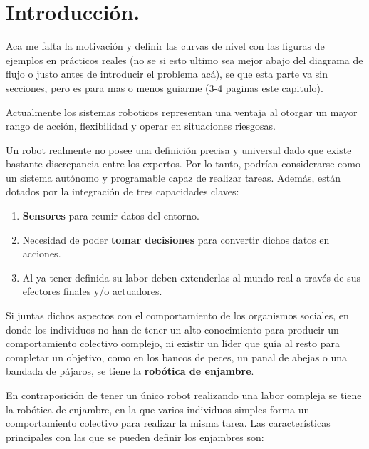 

\chapter{Introducción.} 
\label{ch:chapter1}
\setlength{\parindent}{0cm}
\setlength{\parskip}{4mm}

Aca me falta la motivación y definir las curvas de nivel con las figuras de ejemplos en prácticos reales (no se si esto ultimo sea mejor abajo del diagrama de flujo o justo antes de introducir el problema acá), se que esta parte va sin secciones, pero es para mas o menos guiarme (3-4 paginas este capitulo).

Actualmente los sistemas roboticos representan una ventaja al otorgar un mayor rango de acción, flexibilidad y operar en situaciones riesgosas.

Un robot realmente no posee una definición precisa y universal dado que existe bastante discrepancia entre los expertos. Por lo tanto, podrían considerarse como un sistema autónomo y programable capaz de realizar tareas. Además, están dotados por la integración de tres capacidades claves:

\begin{enumerate}
	\item \textbf{Sensores} para reunir datos del entorno.
	\item Necesidad de poder \textbf{tomar decisiones} para convertir dichos datos en acciones.
	\item Al ya tener definida su labor deben extenderlas al mundo real a través de sus efectores finales y/o actuadores.
\end{enumerate}

Si juntas dichos aspectos con el comportamiento de los organismos sociales, en donde los individuos no han de tener un alto conocimiento para producir un comportamiento colectivo complejo, ni existir un líder que guía al resto para completar un objetivo, como en los bancos de peces, un panal de abejas o una bandada de pájaros, se tiene la \textbf{robótica de enjambre}.

En contraposición de tener un único robot realizando una labor compleja se tiene la robótica de enjambre, en la que varios individuos simples forma un comportamiento colectivo para realizar la misma tarea. Las características principales con las que se pueden definir los enjambres son:


